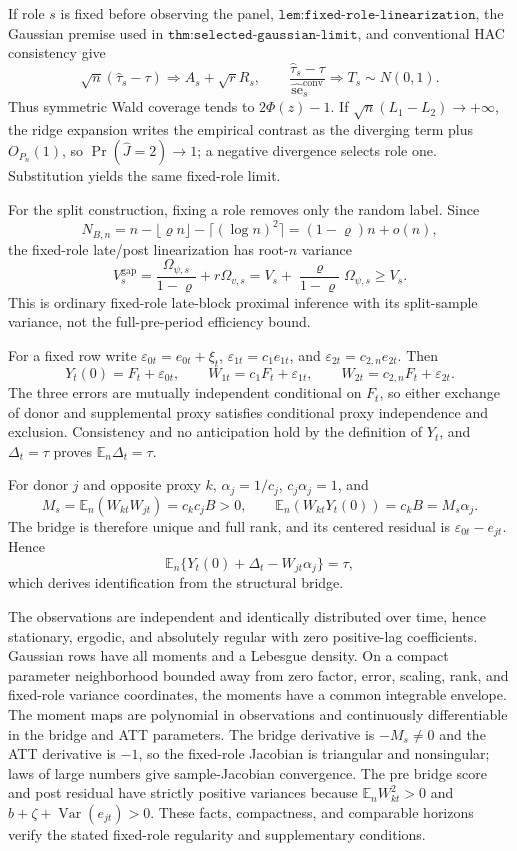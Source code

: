 If role \(s\) is fixed before observing the panel, \(\texttt{lem:fixed-role-linearization}\), the Gaussian premise used in \(\texttt{thm:selected-gaussian-limit}\), and conventional HAC consistency give
\[
 \sqrt n(\widehat\tau_s-\tau)\Rightarrow A_s+\sqrt rR_s,
 \qquad
 \frac{\widehat\tau_s-\tau}{\widehat{\operatorname{se}}_s^{\mathrm{conv}}}
 \Rightarrow T_s\sim N(0,1).
\]
Thus symmetric Wald coverage tends to \(2\Phi(z)-1\).  If \(\sqrt n(L_1-L_2)\to+\infty\), the ridge expansion writes the empirical contrast as the diverging term plus \(O_{P_n}(1)\), so \(\Pr(\widehat J=2)\to1\); a negative divergence selects role one.  Substitution yields the same fixed-role limit.

For the split construction, fixing a role removes only the random label.  Since
\[
 N_{B,n}=n-\lfloor\varrho n\rfloor-\lceil(\log n)^2\rceil
 =(1-\varrho)n+o(n),
\]
the fixed-role late/post linearization has root-\(n\) variance
\[
 V_s^{\mathrm{gap}}=\frac{\Omega_{\psi,s}}{1-\varrho}+r\Omega_{v,s}
 =V_s+\frac{\varrho}{1-\varrho}\Omega_{\psi,s}\geq V_s.
\]
This is ordinary fixed-role late-block proximal inference with its split-sample variance, not the full-pre-period efficiency bound.

For a fixed row write \(\varepsilon_{0t}=e_{0t}+\xi_t\), \(\varepsilon_{1t}=c_1e_{1t}\), and \(\varepsilon_{2t}=c_{2,n}e_{2t}\).  Then
\[
 Y_t(0)=F_t+\varepsilon_{0t},\qquad
 W_{1t}=c_1F_t+\varepsilon_{1t},\qquad
 W_{2t}=c_{2,n}F_t+\varepsilon_{2t}.
\]
The three errors are mutually independent conditional on \(F_t\), so either exchange of donor and supplemental proxy satisfies conditional proxy independence and exclusion.  Consistency and no anticipation hold by the definition of \(Y_t\), and \(\Delta_t=\tau\) proves \(\mathbb E_n\Delta_t=\tau\).

For donor \(j\) and opposite proxy \(k\), \(\alpha_j=1/c_j\), \(c_j\alpha_j=1\), and
\[
 M_s=\mathbb E_n(W_{kt}W_{jt})=c_kc_jB>0,
 \qquad
 \mathbb E_n(W_{kt}Y_t(0))=c_kB=M_s\alpha_j.
\]
The bridge is therefore unique and full rank, and its centered residual is \(\varepsilon_{0t}-e_{jt}\).  Hence
\[
 \mathbb E_n\{Y_t(0)+\Delta_t-W_{jt}\alpha_j\}=\tau,
\]
which derives identification from the structural bridge.

The observations are independent and identically distributed over time, hence stationary, ergodic, and absolutely regular with zero positive-lag coefficients.  Gaussian rows have all moments and a Lebesgue density.  On a compact parameter neighborhood bounded away from zero factor, error, scaling, rank, and fixed-role variance coordinates, the moments have a common integrable envelope.  The moment maps are polynomial in observations and continuously differentiable in the bridge and ATT parameters.  The bridge derivative is \(-M_s\ne0\) and the ATT derivative is \(-1\), so the fixed-role Jacobian is triangular and nonsingular; laws of large numbers give sample-Jacobian convergence.  The pre bridge score and post residual have strictly positive variances because \(\mathbb E_nW_{kt}^2>0\) and \(b+\zeta+\operatorname{Var}(e_{jt})>0\).  These facts, compactness, and comparable horizons verify the stated fixed-role regularity and supplementary conditions.

